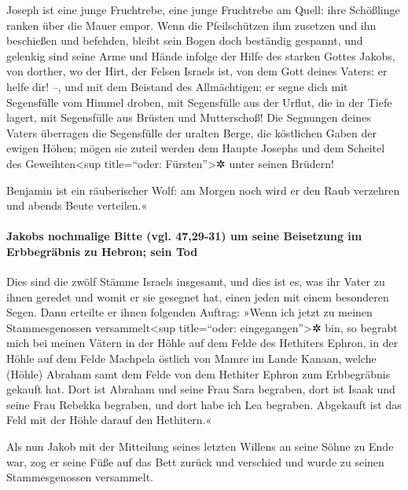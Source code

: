  Joseph ist eine junge Fruchtrebe, eine junge Fruchtrebe
am Quell: ihre Schößlinge ranken über die Mauer empor. 
Wenn die Pfeilschützen ihm zusetzen und ihn beschießen und befehden,
 bleibt sein Bogen doch beständig gespannt, und gelenkig
sind seine Arme und Hände infolge der Hilfe des starken Gottes Jakobs,
von dorther, wo der Hirt, der Felsen Israels ist,  von
dem Gott deines Vaters: er helfe dir! --, und mit dem Beistand des
Allmächtigen: er segne dich mit Segensfülle vom Himmel droben, mit
Segensfülle aus der Urflut, die in der Tiefe lagert, mit Segensfülle aus
Brüsten und Mutterschoß!  Die Segnungen deines Vaters
überragen die Segensfülle der uralten Berge, die köstlichen Gaben der
ewigen Höhen; mögen sie zuteil werden dem Haupte Josephs und dem
Scheitel des Geweihten\textless sup title=``oder: Fürsten''\textgreater✲
unter seinen Brüdern!

 Benjamin ist ein räuberischer Wolf: am Morgen noch wird
er den Raub verzehren und abends Beute verteilen.«

\hypertarget{jakobs-nochmalige-bitte-vgl.-4729-31-um-seine-beisetzung-im-erbbegruxe4bnis-zu-hebron-sein-tod}{%
\paragraph{Jakobs nochmalige Bitte (vgl. 47,29-31) um seine Beisetzung
im Erbbegräbnis zu Hebron; sein
Tod}\label{jakobs-nochmalige-bitte-vgl.-4729-31-um-seine-beisetzung-im-erbbegruxe4bnis-zu-hebron-sein-tod}}

 Dies sind die zwölf Stämme Israels insgesamt, und dies
ist es, was ihr Vater zu ihnen geredet und womit er sie gesegnet hat,
einen jeden mit einem besonderen Segen.  Dann erteilte er
ihnen folgenden Auftrag: »Wenn ich jetzt zu meinen Stammesgenossen
versammelt\textless sup title=``oder: eingegangen''\textgreater✲ bin, so
begrabt mich bei meinen Vätern in der Höhle auf dem Felde des Hethiters
Ephron,  in der Höhle auf dem Felde Machpela östlich von
Mamre im Lande Kanaan, welche (Höhle) Abraham samt dem Felde von dem
Hethiter Ephron zum Erbbegräbnis gekauft hat.  Dort ist
Abraham und seine Frau Sara begraben, dort ist Isaak und seine Frau
Rebekka begraben, und dort habe ich Lea begraben. 
Abgekauft ist das Feld mit der Höhle darauf den Hethitern.«

 Als nun Jakob mit der Mitteilung seines letzten Willens
an seine Söhne zu Ende war, zog er seine Füße auf das Bett zurück und
verschied und wurde zu seinen Stammesgenossen versammelt.

